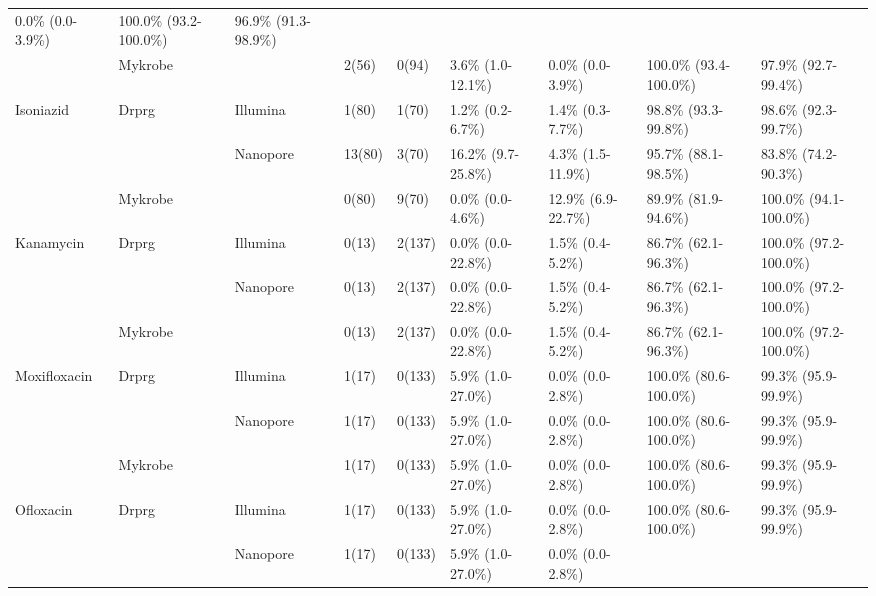 \begin{table}
{\begin{tabular}{|l|l|l|l|l|l|l|l|l|}
  0.0\% (0.0-3.9\%) &
  100.0\% (93.2-100.0\%) &
  96.9\% (91.3-98.9\%) \\ \cline{2-2} \cline{4-9} 
 &
  Mykrobe &
   &
  2(56) &
  0(94) &
  3.6\% (1.0-12.1\%) &
  0.0\% (0.0-3.9\%) &
  100.0\% (93.4-100.0\%) &
  97.9\% (92.7-99.4\%) \\ \hline
\multirow{3}{*}{Isoniazid} &
  \multirow{2}{*}{Drprg} &
  Illumina &
  1(80) &
  1(70) &
  1.2\% (0.2-6.7\%) &
  1.4\% (0.3-7.7\%) &
  98.8\% (93.3-99.8\%) &
  98.6\% (92.3-99.7\%) \\ \cline{3-9} 
 &
   &
  \multirow{2}{*}{Nanopore} &
  13(80) &
  3(70) &
  16.2\% (9.7-25.8\%) &
  4.3\% (1.5-11.9\%) &
  95.7\% (88.1-98.5\%) &
  83.8\% (74.2-90.3\%) \\ \cline{2-2} \cline{4-9} 
 &
  Mykrobe &
   &
  0(80) &
  9(70) &
  0.0\% (0.0-4.6\%) &
  12.9\% (6.9-22.7\%) &
  89.9\% (81.9-94.6\%) &
  100.0\% (94.1-100.0\%) \\ \hline
\multirow{3}{*}{Kanamycin} &
  \multirow{2}{*}{Drprg} &
  Illumina &
  0(13) &
  2(137) &
  0.0\% (0.0-22.8\%) &
  1.5\% (0.4-5.2\%) &
  86.7\% (62.1-96.3\%) &
  100.0\% (97.2-100.0\%) \\ \cline{3-9} 
 &
   &
  \multirow{2}{*}{Nanopore} &
  0(13) &
  2(137) &
  0.0\% (0.0-22.8\%) &
  1.5\% (0.4-5.2\%) &
  86.7\% (62.1-96.3\%) &
  100.0\% (97.2-100.0\%) \\ \cline{2-2} \cline{4-9} 
 &
  Mykrobe &
   &
  0(13) &
  2(137) &
  0.0\% (0.0-22.8\%) &
  1.5\% (0.4-5.2\%) &
  86.7\% (62.1-96.3\%) &
  100.0\% (97.2-100.0\%) \\ \hline
\multirow{3}{*}{Moxifloxacin} &
  \multirow{2}{*}{Drprg} &
  Illumina &
  1(17) &
  0(133) &
  5.9\% (1.0-27.0\%) &
  0.0\% (0.0-2.8\%) &
  100.0\% (80.6-100.0\%) &
  99.3\% (95.9-99.9\%) \\ \cline{3-9} 
 &
   &
  \multirow{2}{*}{Nanopore} &
  1(17) &
  0(133) &
  5.9\% (1.0-27.0\%) &
  0.0\% (0.0-2.8\%) &
  100.0\% (80.6-100.0\%) &
  99.3\% (95.9-99.9\%) \\ \cline{2-2} \cline{4-9} 
 &
  Mykrobe &
   &
  1(17) &
  0(133) &
  5.9\% (1.0-27.0\%) &
  0.0\% (0.0-2.8\%) &
  100.0\% (80.6-100.0\%) &
  99.3\% (95.9-99.9\%) \\ \hline
\multirow{3}{*}{Ofloxacin} &
  \multirow{2}{*}{Drprg} &
  Illumina &
  1(17) &
  0(133) &
  5.9\% (1.0-27.0\%) &
  0.0\% (0.0-2.8\%) &
  100.0\% (80.6-100.0\%) &
  99.3\% (95.9-99.9\%) \\ \cline{3-9} 
 &
   &
  \multirow{2}{*}{Nanopore} &
  1(17) &
  0(133) &
  5.9\% (1.0-27.0\%) &
  0.0\% (0.0-2.8\%) &

\end{tabular}}
\end{table}
